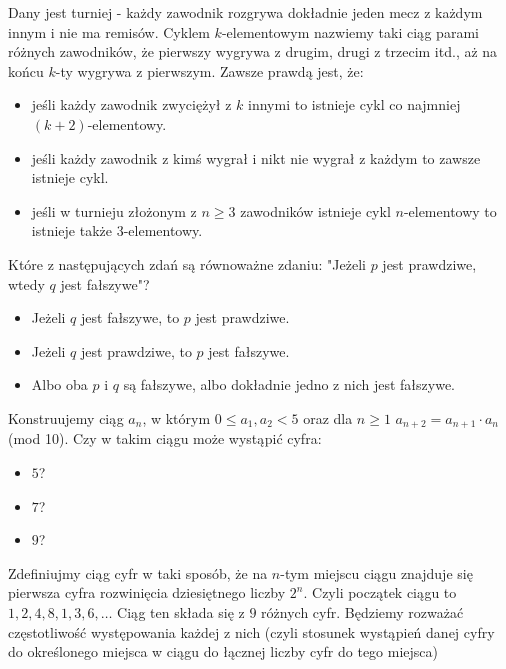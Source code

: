 \documentclass[12pt, a4paper]{article}
\newcommand{\question}[1]{\normalitem \begin{samepage}#1 \end{samepage}}
\newcommand{\cmark}{\textcolor{green}{T}}%
\newcommand{\xmark}{\textcolor{red}{N}}%
\newcommand{\yes}{\rlap{\framebox(15,15)} {\raisebox{2pt}{\large\hspace{-1pt}\cmark}}%
\hspace{3pt}}
\newcommand{\no}{\rlap{\framebox(15,15)} {\raisebox{2pt}{\large\hspace{-1pt}\xmark}}%
\hspace{3pt}}
\begin{document}
\begin{enumerate}
	\question {
		Dany jest turniej - każdy zawodnik rozgrywa dokładnie jeden mecz z każdym innym i nie ma remisów. Cyklem $k$-elementowym nazwiemy taki ciąg parami różnych zawodników, że pierwszy wygrywa z drugim, drugi z trzecim itd., aż na końcu $k$-ty wygrywa z pierwszym. Zawsze prawdą jest, że:
	
			\begin{itemize}
			\item [\yes]jeśli każdy zawodnik zwyciężył z $k$ innymi to istnieje cykl co najmniej $(k+2)$-elementowy.
			\item [\yes]jeśli każdy zawodnik z kimś wygrał i nikt nie wygrał z każdym to zawsze istnieje cykl.
			\item [\yes]jeśli w turnieju złożonym z $n \geq 3$ zawodników istnieje cykl $n$-elementowy to istnieje także $3$-elementowy.
		\end{itemize}
	}
	
	\question {
		Które z następujących zdań są równoważne zdaniu: "Jeżeli $p$ jest prawdziwe, wtedy $q$ jest fałszywe"?
	
		\begin{itemize}
			\item [\no]Jeżeli $q$ jest fałszywe, to $p$ jest prawdziwe. 
			\item [\yes]Jeżeli $q$ jest prawdziwe, to $p$ jest fałszywe.
			\item [\yes]Albo oba $p$ i $q$ są fałszywe, albo dokładnie jedno z nich jest fałszywe. 
		\end{itemize}
	}
	
	\question {
		Konstruujemy ciąg $a_n$, w którym $0 \leq a_1,a_2 < 5$ oraz dla $n \geq 1$ $a_{n+2}=a_{n+1} \cdot a_n $ (mod 10). Czy w takim ciągu może wystąpić cyfra:
	
		\begin{itemize}
			\item [\no]$5$?
			\item [\yes]$7$?
			\item [\yes]$9$?
		\end{itemize}
	}
	
	\question {
		Zdefiniujmy ciąg cyfr w taki sposób, że na $n$-tym miejscu ciągu znajduje się pierwsza cyfra rozwinięcia dziesiętnego liczby $2^n$. Czyli początek ciągu to $1, 2, 4, 8, 1, 3, 6, \ldots$ Ciąg ten składa się z $9$ różnych cyfr. Będziemy rozważać częstotliwość występowania każdej z nich (czyli stosunek wystąpień danej cyfry do określonego miejsca w ciągu do łącznej liczby cyfr do tego miejsca)
	
}
\end{enumerate}
\end{document}
